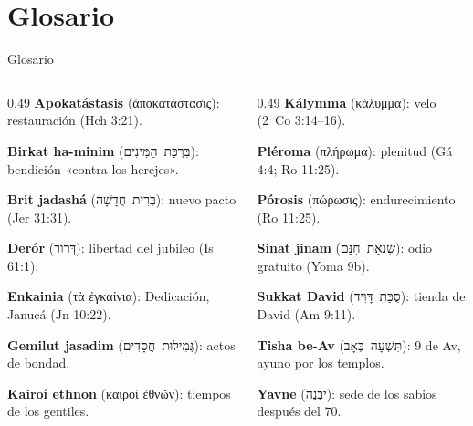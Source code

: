\documentclass[hyperref={bookmarks=false},aspectratio=169]{beamer}
\newcommand{\heb}[1]{\mbox{\foreignlanguage{hebrew}{#1}}}
\newcommand{\grc}[1]{\foreignlanguage{ancientgreek}{#1}}
\begin{document}
\section{Glosario}
\begin{frame}{Glosario}
\begin{columns}[t,onlytextwidth]
\begin{column}{0.49\textwidth}\scriptsize
\textbf{Apokatástasis} (\grc{ἀποκατάστασις}): restauración (Hch 3:21).\par\smallskip
\textbf{Birkat ha-minim} (\heb{בִּרְכַּת הַמִּינִים}): bendición «contra los herejes».\par\smallskip
\textbf{Brit jadashá} (\heb{בְּרִית חֲדָשָׁה}): nuevo pacto (Jer 31:31).\par\smallskip
\textbf{Derór} (\heb{דְּרוֹר}): libertad del jubileo (Is 61:1).\par\smallskip
\textbf{Enkainia} (\grc{τὰ ἐγκαίνια}): Dedicación, Janucá (Jn 10:22).\par\smallskip
\textbf{Gemilut jasadim} (\heb{גְּמִילוּת חֲסָדִים}): actos de bondad.\par\smallskip
\textbf{Kairoí ethnōn} (\grc{καιροὶ ἐθνῶν}): tiempos de los gentiles.
\end{column}
\begin{column}{0.49\textwidth}\scriptsize
\textbf{Kálymma} (\grc{κάλυμμα}): velo (2~Co 3:14--16).\par\smallskip
\textbf{Pléroma} (\grc{πλήρωμα}): plenitud (Gá 4:4; Ro 11:25).\par\smallskip
\textbf{Pórosis} (\grc{πώρωσις}): endurecimiento (Ro 11:25).\par\smallskip
\textbf{Sinat jinam} (\heb{שִׂנְאַת חִנָּם}): odio gratuito (Yoma 9b).\par\smallskip
\textbf{Sukkat David} (\heb{סֻכַּת דָּוִיד}): tienda de David (Am 9:11).\par\smallskip
\textbf{Tisha be-Av} (\heb{תִּשְׁעָה בְּאָב}): 9 de Av, ayuno por los templos.\par\smallskip
\textbf{Yavne} (\heb{יַבְנֶה}): sede de los sabios después del 70.
\end{column}
\end{columns}
\end{frame}

\end{document}
